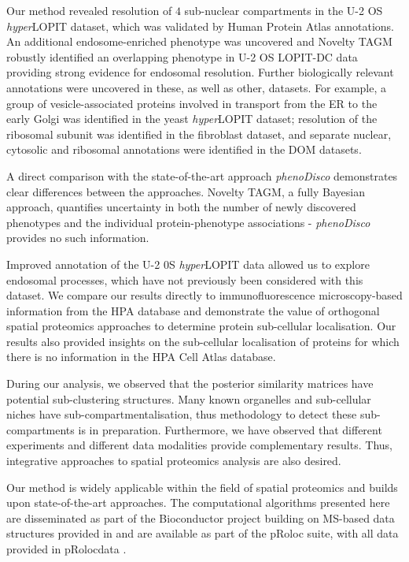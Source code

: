 \documentclass[12pt,english]{article}
\begin{document}
Our method revealed resolution of $4$ sub-nuclear compartments in the U-2 OS \textit{hyper}LOPIT dataset, which was validated by Human Protein Atlas annotations. An additional endosome-enriched phenotype was uncovered and Novelty TAGM robustly identified an overlapping phenotype in U-2 OS LOPIT-DC data providing strong evidence for endosomal resolution. Further biologically relevant annotations were uncovered in these, as well as other, datasets. For example, a group of vesicle-associated proteins involved in transport from the ER to the early Golgi was identified in the yeast \textit{hyper}LOPIT dataset; resolution of the ribosomal subunit was identified in the fibroblast dataset, and separate nuclear, cytosolic and ribosomal annotations were identified in the DOM datasets.

A direct comparison with the state-of-the-art approach \textit{phenoDisco} demonstrates clear differences between the approaches. Novelty TAGM, a fully Bayesian approach, quantifies uncertainty in both the number of newly discovered phenotypes and the individual protein-phenotype associations - \textit{phenoDisco} provides no such information.

Improved annotation of the U-2 0S \textit{hyper}LOPIT data allowed us to explore endosomal processes, which have not previously been considered with this dataset. We compare our results directly to immunofluorescence microscopy-based information from the HPA database and demonstrate the value of orthogonal spatial proteomics approaches to determine protein sub-cellular localisation. Our results also provided insights on the sub-cellular localisation of proteins for which there is no information in the HPA Cell Atlas database. 

During our analysis, we observed that the posterior similarity matrices have potential sub-clustering structures. Many known organelles and sub-cellular niches have sub-compartmentalisation, thus methodology to detect these sub-compartments is in preparation. Furthermore, we have observed that different experiments and different data modalities provide complementary results. Thus, integrative approaches to spatial proteomics analysis are also desired. 

Our method is widely applicable within the field of spatial proteomics and builds upon state-of-the-art approaches. The computational algorithms presented here are disseminated as part of the Bioconductor project \citep{Bioconductor::2004, Huber:2015} building on MS-based data structures provided in \cite{MSnbase:2012} and are available as part of the pRoloc suite, with all data provided in pRolocdata \citep{pRoloc:2014}.
\end{document}
